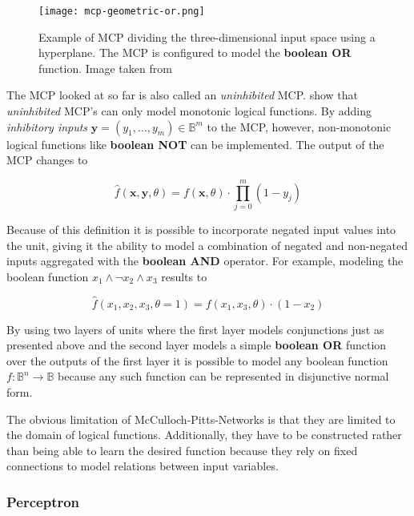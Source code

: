 \begin{figure}[htb!]
    \centering
    \texttt{[image: mcp-geometric-or.png]}
    \caption{Example of MCP dividing the three-dimensional input space using a hyperplane. The MCP is configured to model the \textbf{boolean OR} function. Image taken from \cite{rojas_neural_1996}}
    \label{fig:mcp-geometric-or}
\end{figure}

The MCP looked at so far is also called an \textit{uninhibited} MCP.
\cite{rojas_neural_1996} show that \textit{uninhibited} MCP's can only model monotonic logical functions.
By adding \textit{inhibitory inputs} $\bm{y} = (y_1, \dots, y_m) \in \mathbb{B}^m$ to the MCP, however, non-monotonic logical functions like \textbf{boolean NOT} can be implemented.
The output of the MCP changes to

\begin{equation}
    \hat{f}(\bm{x}, \bm{y}, \theta) = f(\bm{x}, \theta) \cdot \prod_{j = 0}^m (1 - y_j)
\end{equation}

Because of this definition it is possible to incorporate negated input values into the unit, giving it the ability to model a combination of negated and non-negated inputs aggregated with the \textbf{boolean AND} operator.
For example, modeling the boolean function $x_1 \wedge \neg x_2 \wedge x_3$ results to

\begin{equation}
    \hat{f}(x_1, x_2, x_3, \theta=1) = f(x_1, x_3, \theta) \cdot (1 - x_2)
\end{equation}

By using two layers of units where the first layer models conjunctions just as presented above and the second layer models a simple \textbf{boolean OR} function over the outputs of the first layer it is possible to model any boolean function $f: \mathbb{B}^n \to \mathbb{B}$ because any such function can be represented in disjunctive normal form.

The obvious limitation of McCulloch-Pitts-Networks is that they are limited to the domain of logical functions.
Additionally, they have to be constructed rather than being able to learn the desired function because they rely on fixed connections to model relations between input variables.

\subsubsection{Perceptron}

